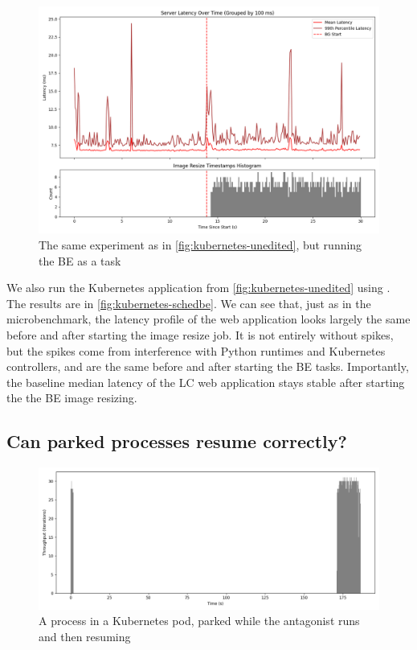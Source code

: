\begin{figure}[t]
    \centering
    \includegraphics[width=\columnwidth]{graphs/kubernetes-schedbe.png}
    \caption{The same experiment as in \autoref{fig:kubernetes-unedited}, but
    running the BE as a \schedbe{} task}\label{fig:kubernetes-schedbe}
\end{figure}

We also run the Kubernetes application from \autoref{fig:kubernetes-unedited}
using \schedbe{}. The results are in \autoref{fig:kubernetes-schedbe}. We can
see that, just as in the microbenchmark, the latency profile of the web
application looks largely the same before and after starting the image resize
job. It is not entirely without spikes, but the spikes come from interference
with Python runtimes and Kubernetes controllers, and are the same before and
after starting the BE tasks. Importantly, the baseline median latency of the LC
web application stays stable after starting the the BE image resizing. 

\subsection{Can parked processes resume correctly?}\label{ss:eval:parking}


\begin{figure}[t]
    \centering
    \includegraphics[width=\columnwidth]{graphs/parked-kubernetes.png}
    \caption{A \beclass{} process in a Kubernetes pod, parked while the
    antagonist runs and then resuming}\label{fig:parked-kubernetes}
\end{figure}

